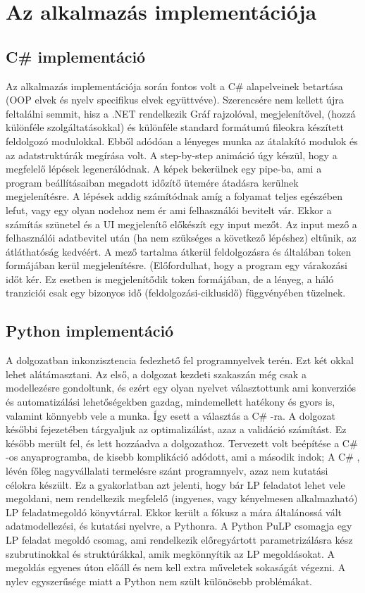 \chapter{Az alkalmazás implementációja}
\section{C\# implementáció}
Az alkalmazás implementációja során fontos volt a C\# alapelveinek betartása (OOP elvek és nyelv specifikus elvek együttvéve). Szerencsére nem kellett újra feltalálni semmit, hisz a .NET rendelkezik Gráf rajzolóval, megjelenítővel, (hozzá különféle szolgáltatásokkal) és különféle standard formátumú fileokra készített feldolgozó modulokkal. Ebből adódóan a lényeges munka az átalakító modulok és az adatstruktúrák megírása volt. 
A step-by-step animáció úgy készül, hogy a megfelelő lépések legenerálódnak. A képek bekerülnek egy pipe-ba, ami a program beállításaiban megadott időzítő ütemére átadásra kerülnek megjelenítésre. 
A lépések addig számítódnak amíg a folyamat teljes egészében lefut, vagy egy olyan nodehoz nem ér ami felhasználói bevitelt vár. Ekkor a számítás szünetel és a UI megjelenítő előkészít egy input mezőt. Az input mező a felhasználói adatbevitel után (ha nem szükséges a következő lépéshez) eltűnik, az átláthatóság kedvéért. A mező tartalma átkerül feldolgozásra és általában token formájában kerül megjelenítésre. (Előfordulhat, hogy a program egy várakozási időt kér. Ez esetben is megjelenítődik token formájában, de a lényeg, a háló tranziciói csak egy bizonyos idő (feldolgozási-ciklusidő) függvényében tüzelnek. 

\section{Python implementáció}
A dolgozatban inkonzisztencia fedezhető fel programnyelvek terén. Ezt két okkal lehet alátámasztani. Az első, a dolgozat kezdeti szakaszán még csak a modellezésre gondoltunk, és ezért egy olyan nyelvet választottunk ami konverziós és automatizálási lehetőségekben gazdag, mindemellett hatékony és gyors is, valamint könnyebb vele a munka. Így esett a választás a C\# -ra. A dolgozat későbbi fejezetében tárgyaljuk az optimalizálást, azaz a validáció számítást. Ez később merült fel, és lett hozzáadva a dolgozathoz. Tervezett volt beépítése a  C\# -os anyaprogramba, de kisebb komplikáció adódott, ami a második indok; A C\# , lévén főleg nagyvállalati termelésre szánt programnyelv, azaz nem kutatási célokra készült. Ez a gyakorlatban azt jelenti, hogy bár LP feladatot lehet vele megoldani, nem rendelkezik megfelelő (ingyenes, vagy kényelmesen alkalmazható) LP feladatmegoldó könyvtárral. Ekkor került a fókusz a mára általánossá vált adatmodellezési, és kutatási nyelvre, a Pythonra. A Python PuLP csomagja egy LP feladat megoldó csomag, ami rendelkezik előregyártott parametrizálásra kész szubrutinokkal és struktúrákkal, amik megkönnyítik az LP megoldásokat. A megoldás egyenes úton előáll és nem kell extra műveletek sokaságát végezni. A nylev egyszerűsége miatt a Python nem szült különösebb problémákat. 

